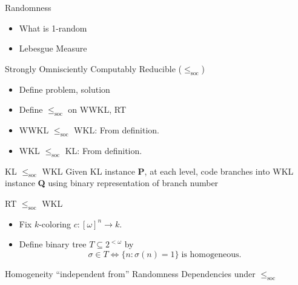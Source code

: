 \begin{frame}{Randomness}
  \begin{itemize}
    \item What is 1-random
    \item Lebesgue Measure
  \end{itemize}
\end{frame}

\begin{frame}{Strongly Omnisciently Computably Reducible
  ($\leq_{\text{soc}}$)}
  \begin{itemize}
    \item Define problem, solution
    \item Define $\leq_{\text{soc}}$ on WWKL, RT
    \item WWKL $\leq_{\text{soc}}$ WKL: From definition.
    \item WKL $\leq_{\text{soc}}$ KL: From definition.
  \end{itemize}
\end{frame}

\begin{frame}{KL $\leq_{\text{soc}}$ WKL}
  Given KL instance \textbf{P}, at each level, code branches into WKL
  instance \textbf{Q} using binary representation of branch number
\end{frame}

\begin{frame}{RT $\leq_{\text{soc}}$ WKL}
  \begin{itemize}
    \item Fix $k$-coloring $c:[\omega]^n\rightarrow k$.
    \item Define binary tree $T\subseteq 2^{<\omega}$ by
      \[\sigma\in T \Leftrightarrow \{n:\sigma(n)=1\}\; \text{is
      homogeneous}.\]
  \end{itemize}
\end{frame}

\begin{frame}{Homogeneity ``independent from'' Randomness}
  Dependencies under $\leq_{\text{soc}}$
  \vspace{2em}

  \begin{center}
  \end{center}
\end{frame}
